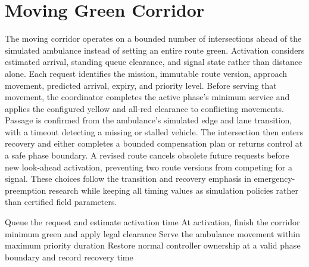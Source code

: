 \section{Moving Green Corridor}

The moving corridor operates on a bounded number of intersections ahead of the simulated ambulance instead of setting an entire route green. Activation considers estimated arrival, standing queue clearance, and signal state rather than distance alone. Each request identifies the mission, immutable route version, approach movement, predicted arrival, expiry, and priority level. Before serving that movement, the coordinator completes the active phase's minimum service and applies the configured yellow and all-red clearance to conflicting movements. Passage is confirmed from the ambulance's simulated edge and lane transition, with a timeout detecting a missing or stalled vehicle. The intersection then enters recovery and either completes a bounded compensation plan or returns control at a safe phase boundary. A revised route cancels obsolete future requests before new look-ahead activation, preventing two route versions from competing for a signal. These choices follow the transition and recovery emphasis in emergency-preemption research \cite{qin2012preemption} while keeping all timing values as simulation policies rather than certified field parameters.

\begin{algorithm}[H]
\caption{Corridor lifecycle at one intersection}
\label{alg:corridor}
Queue the request and estimate activation time\;
At activation, finish the corridor minimum green and apply legal clearance\;
Serve the ambulance movement within maximum priority duration\;
Restore normal controller ownership at a valid phase boundary and record recovery time\;
\end{algorithm}

